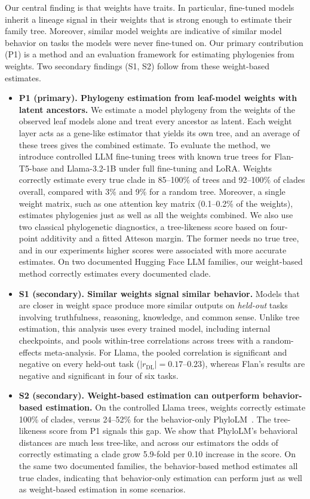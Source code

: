 \documentclass{article}
\theoremstyle{definition}
\theoremstyle{plain}
\begin{document}
Our central finding is that weights have traits. In particular, fine-tuned models inherit a lineage signal in their weights that is strong enough to estimate their family tree. Moreover, similar model weights are indicative of similar model behavior on tasks the models were never fine-tuned on. Our primary contribution (P1) is a method and an evaluation framework for estimating phylogenies from weights. Two secondary findings (S1, S2) follow from these weight-based estimates.
\begin{itemize}[leftmargin=1.3em,itemsep=1pt,topsep=2pt,parsep=0pt]
  \item \textbf{P1 (primary). Phylogeny estimation from leaf-model weights with latent ancestors.} We estimate a model phylogeny from the weights of the observed leaf models alone and treat every ancestor as latent. Each weight layer acts as a gene-like estimator that yields its own tree, and an average of these trees gives the combined estimate. To evaluate the method, we introduce controlled LLM fine-tuning trees with known true trees for Flan-T5-base and Llama-3.2-1B under full fine-tuning and LoRA. Weights correctly estimate every true clade in 85--100\% of trees and 92--100\% of clades overall, compared with 3\% and 9\% for a random tree. Moreover, a single weight matrix, such as one attention key matrix (0.1--0.2\% of the weights), estimates phylogenies just as well as all the weights combined. We also use two classical phylogenetic diagnostics, a tree-likeness score based on four-point additivity and a fitted Atteson margin. The former needs no true tree, and in our experiments higher scores were associated with more accurate estimates. On two documented Hugging Face LLM families, our weight-based method correctly estimates every documented clade.
  \item \textbf{S1 (secondary). Similar weights signal similar behavior.} Models that are closer in weight space produce more similar outputs on \textit{held-out} tasks involving truthfulness, reasoning, knowledge, and common sense. Unlike tree estimation, this analysis uses every trained model, including internal checkpoints, and pools within-tree correlations across trees with a random-effects meta-analysis. For Llama, the pooled correlation is significant and negative on every held-out task ($|r_{\mathrm{DL}}|=0.17$--$0.23$), whereas Flan's results are negative and significant in four of six tasks.
  \item \textbf{S2 (secondary). Weight-based estimation can outperform behavior-based estimation.} On the controlled Llama trees, weights correctly estimate 100\% of clades, versus 24--52\% for the behavior-only PhyloLM~\citep{yax2025phylolm}. The tree-likeness score from P1 signals this gap. We show that PhyloLM's behavioral distances are much less tree-like, and across our estimators the odds of correctly estimating a clade grow 5.9-fold per 0.10 increase in the score. On the same two documented families, the behavior-based method estimates all true clades, indicating that behavior-only estimation can perform just as well as weight-based estimation in some scenarios.
\end{itemize}
\end{document}
